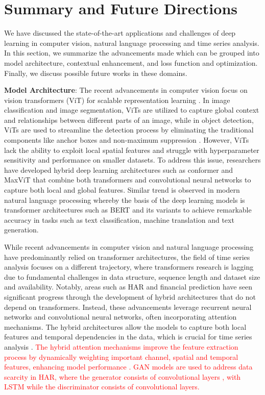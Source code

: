 \documentclass[preprint,12pt]{elsarticle}
\begin{document}
\section{Summary and Future Directions}\label{sec6}
We have discussed the state-of-the-art applications and challenges of deep learning in computer vision, natural language processing and time series analysis. In this section, we summarize the advancements made which can be grouped into model architecture, contextual enhancement, and loss function and optimization. Finally, we discuss possible future works in these domains.

\textbf{Model Architecture}: The recent advancements in computer vision focus on vision transformers (ViT) for scalable representation learning \citep{dosovitskiy_image_2021}. In image classification and image segmentation, ViTs are utilized to capture global context and relationships between different parts of an image, while in object detection, ViTs are used to streamline the detection process by eliminating the traditional components like anchor boxes and non-maximum suppression \citep{carion_end_end_2020}. However, ViTs lack the ability to exploit local spatial features and struggle with hyperparameter sensitivity and performance on smaller datasets. To address this issue, researchers have developed hybrid deep learning architectures such as conformer \citep{peng_conformer_2023} and MaxViT \citep{tu_maxvit_2022} that combine both transformers and convolutional neural networks to capture both local and global features. Similar trend is observed in modern natural language processing whereby the basis of the deep learning models is transformer architectures such as BERT \citep{devlin_bert_2018} and its variants to achieve remarkable accuracy in tasks such as text classification, machine translation and text generation.

While recent advancements in computer vision and natural language processing have predominantly relied on transformer architectures, the field of time series analysis focuses on a different trajectory, where transformers research is lagging due to fundamental challenges in data structure, sequence length and dataset size and availability. Notably, areas such as HAR and financial prediction have seen significant progress through the development of hybrid architectures that do not depend on transformers. Instead, these advancements leverage recurrent neural networks and convolutional neural networks, often incorporating attention mechanisms. The hybrid architectures allow the models to capture both local features and temporal dependencies in the data, which is crucial for time series analysis \citep{khan_attention_2021, ige_deep_2023}. \textcolor{red}{The hybrid attention mechanisms improve the feature extraction process by dynamically weighting important channel, spatial and temporal features, enhancing model performance \citep{gao_danhar_2021, agac_resource-efficient_2024, tang_triple_2022}. GAN models are used to address data scarcity in HAR, where the generator consists of convolutional layers \citep{lupion_data_2024, kia_human_2024}, with LSTM \citep{chan_unified_2021} while the discriminator consists of convolutional layers.}
\end{document}
